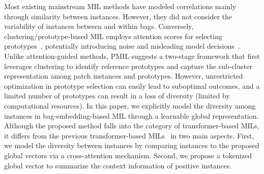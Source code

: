 \documentclass[runningheads]{llncs}
\begin{document}
Most existing mainstream MIL methods have modeled correlations mainly through similarity between instances. However, they did not consider the variability of instances between and within bags. Conversely, clustering/prototype-based MIL employs attention scores for selecting prototypes~\cite{scmil,tpmil}, potentially introducing noise and misleading model decisions~\cite{PDL,iterself}. Unlike attention-guided methods, PMIL \cite{pmil} suggests a two-stage framework that first leverages clustering to identify reference prototypes and capture the sub-cluster representation among patch instances and prototypes. However, unrestricted optimization in prototype selection can easily lead to suboptimal outcomes, and a limited number of prototypes can result in a loss of diversity (limited by computational resources).
In this paper, we explicitly model the diversity among instances in bag-embedding-based MIL through a learnable global representation. Although the proposed method falls into the category of transformer-based MILs, it differs from the previous transformer-based MILs~\cite{shao2021transmil, lowrankmil} in two main aspects. First, we model the diversity between instances by comparing instances to the proposed global vectors via a cross-attention mechanism.
Second, we propose a tokenized global vector to summarize the context information of positive instances. 
\end{document}
